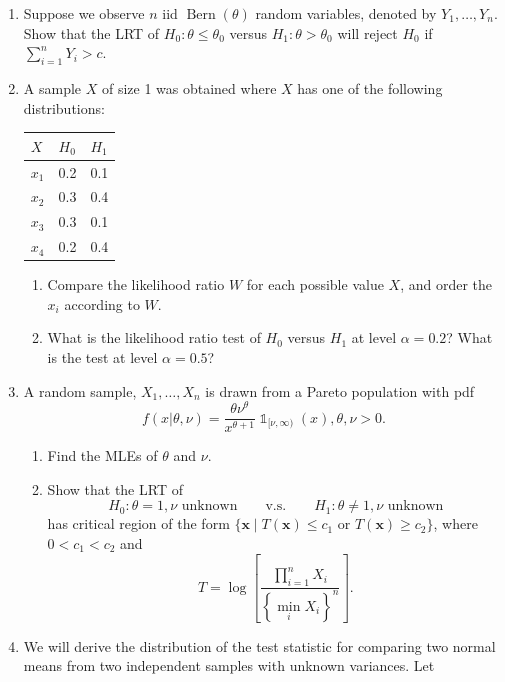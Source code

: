 \documentclass[
]{book}
\newcommand{\bx}{{\boldsymbol x}}
\DeclareMathOperator{\Bern}{Bern}
\DeclareMathOperator{\ind}{\mathds{1}}
\theoremstyle{definition}
\theoremstyle{definition}
\theoremstyle{definition}
\theoremstyle{definition}
\theoremstyle{remark}
\begin{document}
\begin{enumerate}
\def\labelenumi{\arabic{enumi}.}
\item
  Suppose we observe \(n\) iid \(\Bern(\theta)\) random variables, denoted by \(Y_1,\dots,Y_n\). Show that the LRT of \(H_0:\theta \leq \theta_0\) versus \(H_1:\theta>\theta_0\) will reject \(H_0\) if \(\sum_{i=1}^n Y_i > c\).
\item
  A sample \(X\) of size 1 was obtained where \(X\) has one of the following distributions:

  \begin{longtable}[]{@{}lll@{}}
  \toprule
  \(X\) & \(H_0\) & \(H_1\) \\
  \midrule
  \endhead
  \(x_1\) & 0.2 & 0.1 \\
  \(x_2\) & 0.3 & 0.4 \\
  \(x_3\) & 0.3 & 0.1 \\
  \(x_4\) & 0.2 & 0.4 \\
  \bottomrule
  \end{longtable}

  \begin{enumerate}
  \def\labelenumii{(\alph{enumii})}
  \item
    Compare the likelihood ratio \(W\) for each possible value \(X\), and order the \(x_i\) according to \(W\).
  \item
    What is the likelihood ratio test of \(H_0\) versus \(H_1\) at level \(\alpha=0.2\)? What is the test at level \(\alpha=0.5\)?
  \end{enumerate}
\item
  A random sample, \(X_1,\dots,X_n\) is drawn from a Pareto population with pdf
  \[
  f(x|\theta,\nu) = \frac{\theta \nu^\theta}{x^{\theta + 1}} \ind_{[\nu,\infty)}(x), \theta,\nu >0.
  \]

  \begin{enumerate}
  \def\labelenumii{(\alph{enumii})}
  \item
    Find the MLEs of \(\theta\) and \(\nu\).
  \item
    Show that the LRT of
    \[
       H_0:\theta=1, \nu \text{ unknown} \hspace{2em}\text{v.s.}\hspace{2em}H_1:\theta\neq1, \nu \text{ unknown}
       \]
    has critical region of the form \(\{\bx \mid T(\bx) \leq c_1 \text{ or } T(\bx)\geq c_2 \}\), where \(0<c_1<c_2\) and
    \[
       T = \log \left[ \frac{\prod_{i=1}^n X_i}{\left\{\min_i X_i \right\}^n}\right].
       \]
  \end{enumerate}
\item
  We will derive the distribution of the test statistic for comparing two normal means from two independent samples with unknown variances. Let


\end{enumerate}
\end{document}
